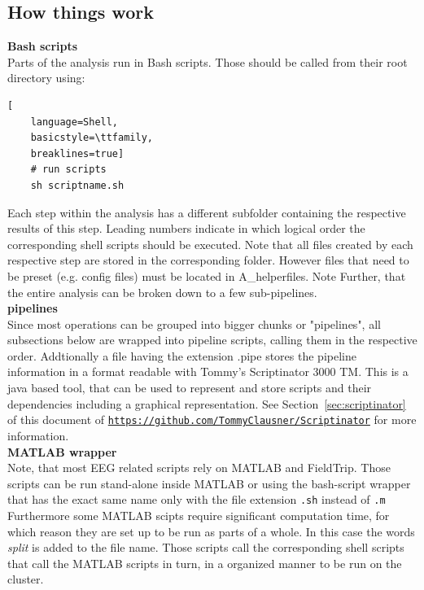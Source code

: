\documentclass[12pt,a4paper]{scrartcl}
\begin{document}
\subsection{How things work}
\noindent\textbf{Bash scripts}\\
\noindent Parts of the analysis run in Bash scripts. Those should be called from their root directory using:
\begin{lstlisting}[
    language=Shell,
    basicstyle=\ttfamily,
    breaklines=true]
    # run scripts
    sh scriptname.sh
\end{lstlisting}
Each step within the analysis has a different subfolder containing the respective results of this step. Leading numbers indicate in which logical order the corresponding shell scripts should be executed. Note that all files created by each respective step are stored in the corresponding folder. However files that need to be preset (e.g. config files) must be located in A\_helperfiles. Note Further, that the entire analysis can be broken down to a few sub-pipelines.\\

\noindent\textbf{pipelines}\\
\noindent Since most operations can be grouped into bigger chunks or "pipelines", all subsections below are wrapped into pipeline scripts, calling them in the respective order. Addtionally a file having the extension .pipe stores the pipeline information in a format readable with Tommy's Scriptinator 3000 TM. This is a java based tool, that can be used to represent and store scripts and their dependencies including a graphical representation. See Section~\ref{sec:scriptinator} of this document of \href{https://github.com/TommyClausner/Scriptinator}{\nolinkurl{https://github.com/TommyClausner/Scriptinator}} for more information.\\

\noindent\textbf{MATLAB wrapper}\\
\noindent Note, that most EEG related scripts rely on MATLAB and FieldTrip. Those scripts can be run stand-alone inside MATLAB or using the bash-script wrapper that has the exact same name only with the file extension \texttt{.sh} instead of \texttt{.m} Furthermore some MATLAB scipts require significant computation time, for which reason they are set up to be run as parts of a whole. In this case the words \textit{split} is added to the file name. Those scripts call the corresponding shell scripts that call the MATLAB scripts in turn, in a organized manner to be run on the cluster.\\
\end{document}
